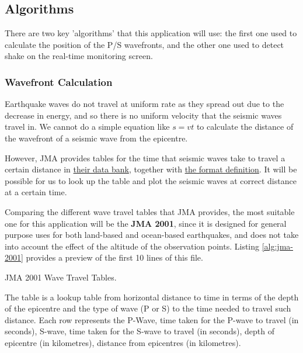 \subsection{Algorithms}

There are two key 'algorithms' that this application will use: the first one used to calculate the position of the P/S wavefronts, and the other one used to detect shake on the real-time monitoring screen.

\subsubsection{Wavefront Calculation}

Earthquake waves do not travel at uniform rate as they spread out due to the decrease in energy, and so there is no uniform velocity that the seismic waves travel in. We cannot do a simple equation like \(s = vt\) to calculate the distance of the wavefront of a seismic wave from the epicentre.

However, JMA provides tables for the time that seismic waves take to travel a certain distance in \href{https://www.data.jma.go.jp/svd/eqev/data/bulletin/catalog/appendix/trtime/trt_j.html}{their data bank}, together with \href{https://www.data.jma.go.jp/svd/eqev/data/bulletin/catalog/appendix/trtime/trt_j.html}{the format definition}. It will be possible for us to look up the table and plot the seismic waves at correct distance at a certain time.

Comparing the different wave travel tables that JMA provides, the most suitable one for this application will be the \textbf{JMA 2001}, since it is designed for general purpose uses for both land-based and ocean-based earthquakes, and does not take into account the effect of the altitude of the observation points. Listing \ref{alg:jma-2001} provides a preview of the first 10 lines of this file.

\begin{listing}[!ht]
    \caption{JMA 2001 Wave Travel Tables.}
    \label{alg:jma-2001}
\end{listing}

The table is a lookup table from horizontal distance to time in terms of the depth of the epicentre and the type of wave (P or S) to the time needed to travel such distance. Each row represents the P-Wave, time taken for the P-wave to travel (in seconds), S-wave, time taken for the S-wave to travel (in seconds), depth of epicentre (in kilometres), distance from epicentres (in kilometres).

